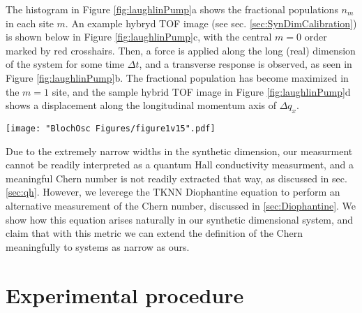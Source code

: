 The histogram in Figure \ref{fig:laughlinPump}a shows the fractional populations $n_m$ in each site $m$. An example hybryd TOF image (see sec. \ref{sec:SynDimCalibration}) is shown below in Figure \ref{fig:laughlinPump}c, with the central $m=0$ order marked by red crosshairs. Then, a force is applied along the long (real) dimension of the system for some time $\Delta t$, and a transverse response is observed, as seen in  Figure \ref{fig:laughlinPump}b. The fractional population has become maximized in the $m=1$ site, and the sample hybrid TOF image in Figure \ref{fig:laughlinPump}d shows a displacement along the longitudinal momentum axis of $\Delta q_x$. 

\begin{figure*}
\texttt{[image: "BlochOsc Figures/figure1v15".pdf]}
\caption[Quantum Hall effect in Hofstadter ribbons]{Quantum Hall effect in Hofstadter ribbons. (a) 5-site wide ribbon with real tunneling coefficients along $\bf{\mathit{e}_s}$   and complex tunneling coefficients along \ex,  creating a non-zero phase  $\phi$ around each plaquette. (b) After applying a force along \ex  for a time $\Delta t$, atomic populations shift transversely along $\bf{\mathit{e}_s}$, signaling the Hall effect. (c,d)  TOF absorption images giving hybrid momentum/position density distributions $n(k_x,m)$. Prior to applying the force (c), the $m=0$ momentum peak is at $k_x=0$, marked by the red cross. Then, in (d), the force directly changed $q_x$, evidenced by the displacement $\Delta q_x$ of crystal momentum, and via the Hall effect shifted population along $\bf{\mathit{e}_s}$. }
\label{fig:laughlinPump}
\end{figure*}

Due to the extremely narrow widths in the synthetic dimension, our measurment cannot be readily interpreted as a quantum Hall conductivity measurment, and a meaningful Chern number is not readily extracted that way, as discussed in sec. \ref{sec:qh}. However, we leverege the TKNN Diophantine equation \cite{Thouless1982} to perform an alternative measurement of the Chern number, discussed in \ref{sec:Diophantine}. We show how this equation arises naturally in our synthetic dimensional system, and claim that with this metric we can extend the definition of the Chern meaningfully to systems as narrow as ours.  

\section{Experimental procedure}

